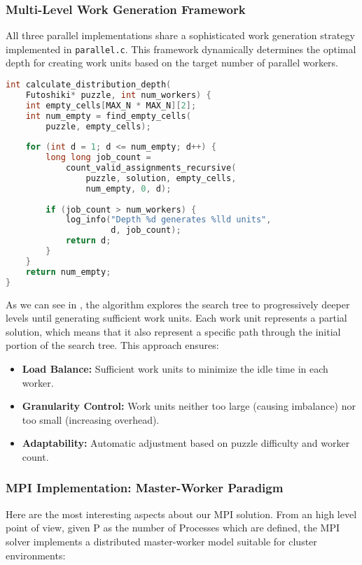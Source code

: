 \subsubsection{Multi-Level Work Generation Framework}
\label{subsubsec:dynamic_load_balancing}
All three parallel implementations share a sophisticated work generation strategy implemented in \texttt{parallel.c}. This framework dynamically determines the optimal depth for creating work units based on the target number of parallel workers.

\begin{lstlisting}[language=C, caption=Dynamic depth calculation,label={listing:calculate_distribution_depth}]
int calculate_distribution_depth(
    Futoshiki* puzzle, int num_workers) {
    int empty_cells[MAX_N * MAX_N][2];
    int num_empty = find_empty_cells(
        puzzle, empty_cells);
    
    for (int d = 1; d <= num_empty; d++) {
        long long job_count = 
            count_valid_assignments_recursive(
                puzzle, solution, empty_cells, 
                num_empty, 0, d);
        
        if (job_count > num_workers) {
            log_info("Depth %d generates %lld units", 
                     d, job_count);
            return d;
        }
    }
    return num_empty;
}
\end{lstlisting}

As we can see in , the algorithm explores the search tree to progressively deeper levels until generating sufficient work units. Each work unit represents a partial solution, which means that it also represent a specific path through the initial portion of the search tree. This approach ensures:
\begin{itemize}
    \item \textbf{Load Balance:} Sufficient work units to minimize the idle time in each worker.
    \item \textbf{Granularity Control:} Work units neither too large (causing imbalance) nor too small (increasing overhead).
    \item \textbf{Adaptability:} Automatic adjustment based on puzzle difficulty and worker count.
\end{itemize}

\subsubsection{MPI Implementation: Master-Worker Paradigm}
\label{subsubsec:mpi_implementation}
Here are the most interesting aspects about our MPI solution. From an high level point of view, given P as the number of Processes which are defined, the MPI solver implements a distributed master-worker model suitable for cluster environments:

